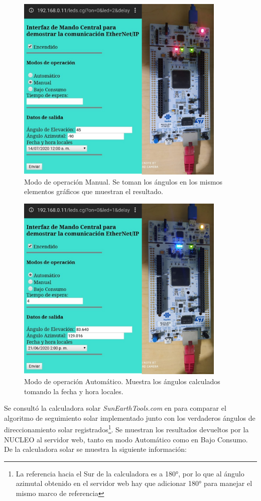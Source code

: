 \begin{figure}[H]
	\centering
	\includegraphics[width=10cm]{imagenes/MC_MANU}
	\caption{Modo de operación Manual. Se toman los ángulos en los mismos elementos gráficos que muestran el resultado.}
	\label{fig:MC_MANU}
\end{figure}
\begin{figure}[H]
	\centering
	\includegraphics[width=10cm]{imagenes/MC_AUTO}
	\caption{Modo de operación Automático. Muestra los ángulos calculados tomando la fecha y hora locales.}
	\label{fig:MC_AUTO}
\end{figure}
Se consultó la calculadora solar \textit{SunEarthTools.com} en \cite{DDC11} para comparar el algoritmo de seguimiento solar implementado junto con los verdaderos ángulos de direccionamiento solar registrados\footnote{La referencia hacia el Sur de la calculadora es a 180°, por lo que al ángulo azimutal obtenido en el servidor web hay que adicionar 180° para manejar el mismo marco de referencia}. Se muestran los resultados devueltos por la NUCLEO al servidor web, tanto en modo Automático como en Bajo Consumo. De la calculadora solar se muestra la siguiente información:

